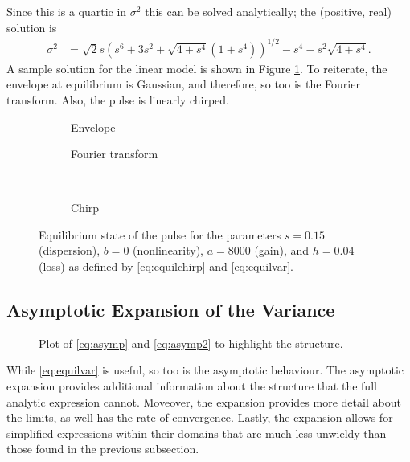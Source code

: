 Since this is a quartic in $\sigma^2$ this can be solved analytically; the (positive, real) solution is
\begin{align}
\label{eq:equilvar}
\sigma^2 &= \sqrt{2} s \left( s^6 + 3s^2 + \sqrt{4 + s^4} \left( 1 + s^4 \right) \right)^{1/2} - s^4 - s^2 \sqrt{4 + s^4}.
\end{align}
A sample solution for the linear model is shown in Figure \ref{fig:linear}. To reiterate, the envelope at equilibrium is Gaussian, and therefore, so too is the Fourier transform. Also, the pulse is linearly chirped. \\

\begin{figure}[tbp]
\centering
\begin{subfigure}{0.5\textwidth}
\centering

\caption{Envelope}
\end{subfigure}%
\begin{subfigure}{0.5\textwidth}
\centering

\caption{Fourier transform}
\end{subfigure} \\
\begin{subfigure}{0.5\textwidth}
\centering

\caption{Chirp}
\end{subfigure}
\caption[Envelope, Fourier transform, and chirp of the pulse---linear case.]{Equilibrium state of the pulse for the parameters $s = 0.15$ (dispersion), $b = 0$ (nonlinearity), $a = 8000$ (gain), and $h = 0.04$ (loss) as defined by \eqref{eq:equilchirp} and \eqref{eq:equilvar}.}
\label{fig:linear}
\end{figure}

\subsection{Asymptotic Expansion of the Variance}
\begin{figure}[tbp]
\centering

\caption{Plot of \eqref{eq:asymp} and \eqref{eq:asymp2} to highlight the structure.}
\label{fig:asympt}
\end{figure}
While \eqref{eq:equilvar} is useful, so too is the asymptotic behaviour. The asymptotic expansion provides additional information about the structure that the full analytic expression cannot. Moveover, the expansion provides more detail about the limits, as well has the rate of convergence. Lastly, the expansion allows for simplified expressions within their domains that are much less unwieldy than those found in the previous subsection. \\

